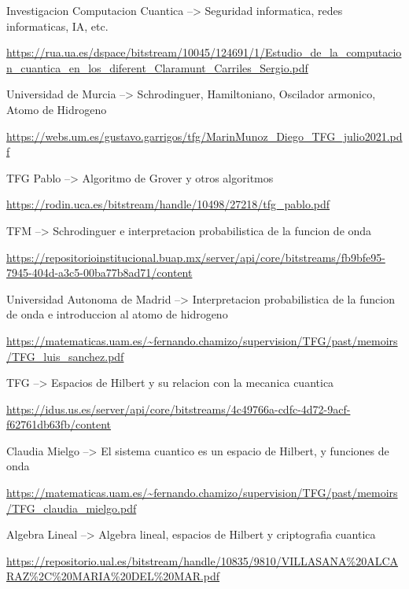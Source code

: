 \documentclass{article}
\numberwithin{equation}{section} %
\begin{document}
        Investigacion Computacion Cuantica --> Seguridad informatica, redes informaticas, IA, etc.\par
        \url{https://rua.ua.es/dspace/bitstream/10045/124691/1/Estudio_de_la_computacion_cuantica_en_los_diferent_Claramunt_Carriles_Sergio.pdf}
        \vspace{2mm}

        Universidad de Murcia --> Schrodinguer, Hamiltoniano, Oscilador armonico, Atomo de Hidrogeno\par
        \url{https://webs.um.es/gustavo.garrigos/tfg/MarinMunoz_Diego_TFG_julio2021.pdf}
        \vspace{2mm}

        TFG Pablo --> Algoritmo de Grover y otros algoritmos\par
        \url{https://rodin.uca.es/bitstream/handle/10498/27218/tfg_pablo.pdf}
        \vspace{2mm}

        TFM --> Schrodinguer e interpretacion probabilistica de la funcion de onda\par
        \url{https://repositorioinstitucional.buap.mx/server/api/core/bitstreams/fb9bfe95-7945-404d-a3c5-00ba77b8ad71/content}
        \vspace{2mm}

        Universidad Autonoma de Madrid --> Interpretacion probabilistica de la funcion de onda e introduccion al atomo de hidrogeno\par
        \url{https://matematicas.uam.es/~fernando.chamizo/supervision/TFG/past/memoirs/TFG_luis_sanchez.pdf}
        \vspace{2mm}

        TFG --> Espacios de Hilbert y su relacion con la mecanica cuantica\par
        \url{https://idus.us.es/server/api/core/bitstreams/4c49766a-cdfc-4d72-9acf-f62761db63fb/content}
        \vspace{2mm}

        Claudia Mielgo --> El sistema cuantico es un espacio de Hilbert, y funciones de onda\par
        \url{https://matematicas.uam.es/~fernando.chamizo/supervision/TFG/past/memoirs/TFG_claudia_mielgo.pdf}
        \vspace{2mm}

        Algebra Lineal --> Algebra lineal, espacios de Hilbert y criptografia cuantica\par
        \url{https://repositorio.ual.es/bitstream/handle/10835/9810/VILLASANA%20ALCARAZ%2C%20MARIA%20DEL%20MAR.pdf}
        \vspace{2mm}
\end{document}
